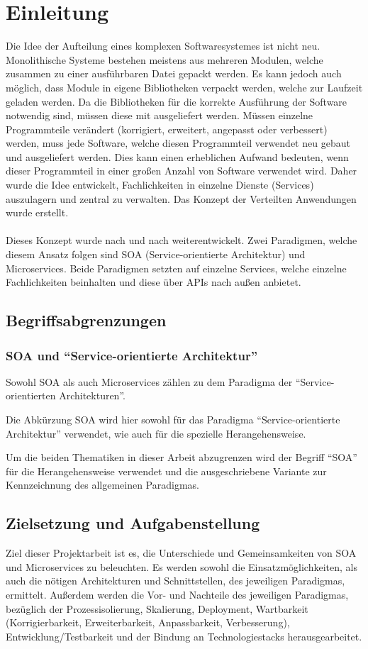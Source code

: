 \chapter{Einleitung}
\label{chap:Einleitung}
Die Idee der Aufteilung eines komplexen Softwaresystemes ist nicht neu. Monolithische Systeme bestehen meistens aus mehreren Modulen, welche zusammen zu einer ausführbaren Datei gepackt werden. Es kann jedoch auch möglich, dass Module in eigene Bibliotheken verpackt werden, welche zur Laufzeit geladen werden. Da die Bibliotheken für die korrekte Ausführung der Software notwendig sind, müssen diese mit ausgeliefert werden. Müssen einzelne Programmteile verändert (korrigiert, erweitert, angepasst oder verbessert) werden, muss jede Software, welche diesen Programmteil verwendet neu gebaut und ausgeliefert werden. Dies kann einen erheblichen Aufwand bedeuten, wenn dieser Programmteil in einer großen Anzahl von Software verwendet wird. Daher wurde die Idee entwickelt, Fachlichkeiten in einzelne Dienste (Services) auszulagern und zentral zu verwalten. Das Konzept der Verteilten Anwendungen wurde erstellt.
\\\\
Dieses Konzept wurde nach und nach weiterentwickelt. Zwei Paradigmen, welche diesem Ansatz folgen sind SOA (Service-orientierte Architektur) und Microservices. Beide Paradigmen setzten auf einzelne Services, welche einzelne Fachlichkeiten beinhalten und diese über APIs nach außen anbietet.

\section{Begriffsabgrenzungen}
\label{sec:Begriffsabgrenzungen}

\subsection*{SOA und "`Service-orientierte Architektur"'}
Sowohl SOA als auch Microservices zählen zu dem Paradigma der "`Service-orientierten Architekturen"'.

Die Abkürzung SOA wird hier sowohl für das Paradigma "`Service-orientierte Architektur"' verwendet, wie auch für die spezielle Herangehensweise.

Um die beiden Thematiken in dieser Arbeit abzugrenzen wird der Begriff "`SOA"' für die Herangehensweise verwendet und die ausgeschriebene Variante zur Kennzeichnung des allgemeinen Paradigmas.

\section{Zielsetzung und Aufgabenstellung}
\label{sec:ZielsetzungUndAufgabenstellung}
Ziel dieser Projektarbeit ist es, die Unterschiede und Gemeinsamkeiten von SOA und Microservices zu beleuchten. Es werden sowohl die Einsatzmöglichkeiten, als auch die nötigen Architekturen und Schnittstellen, des jeweiligen Paradigmas, ermittelt. Außerdem werden die Vor- und Nachteile des jeweiligen Paradigmas, bezüglich der Prozessisolierung, Skalierung, Deployment, Wartbarkeit (Korrigierbarkeit, Erweiterbarkeit, Anpassbarkeit, Verbesserung), Entwicklung/Testbarkeit und der Bindung an Technologiestacks herausgearbeitet. 

